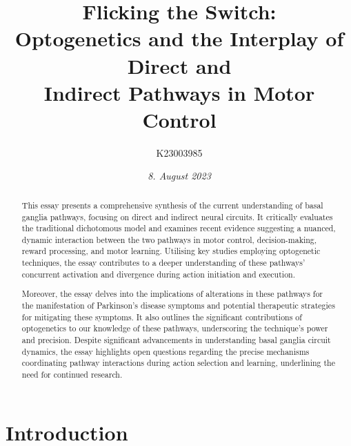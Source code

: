 \documentclass[10pt]{article}
\title{\textbf{Flicking the Switch: } \\ Optogenetics and the Interplay of Direct and \\ Indirect Pathways in Motor Control}
\author[ ]{K23003985}
\affil[ ]{\textbf{King’s College London}}
\affil[ ]{\href{mailto:K23003985@kcl.ac.uk}{K23003985@kcl.ac.uk}}
\date{\textit{8. August 2023}}
\begin{document}

\maketitle
\thispagestyle{empty}

\doublespacing

\begin{sloppypar} %
  \begin{abstract}
    This essay presents a comprehensive synthesis of the current understanding of basal ganglia pathways, focusing on direct and indirect neural circuits. It critically evaluates the traditional dichotomous model and examines recent evidence suggesting a nuanced, dynamic interaction between the two pathways in motor control, decision-making, reward processing, and motor learning. Utilising key studies employing optogenetic techniques, the essay contributes to a deeper understanding of these pathways’ concurrent activation and divergence during action initiation and execution.

    Moreover, the essay delves into the implications of alterations in these pathways for the manifestation of Parkinson’s disease symptoms and potential therapeutic strategies for mitigating these symptoms. It also outlines the significant contributions of optogenetics to our knowledge of these pathways, underscoring the technique’s power and precision. Despite significant advancements in understanding basal ganglia circuit dynamics, the essay highlights open questions regarding the precise mechanisms coordinating pathway interactions during action selection and learning, underlining the need for continued research.
  \end{abstract}
  \pagebreak





  \section{Introduction}
  \label{sec:introduction}


\end{sloppypar}
\end{document}
